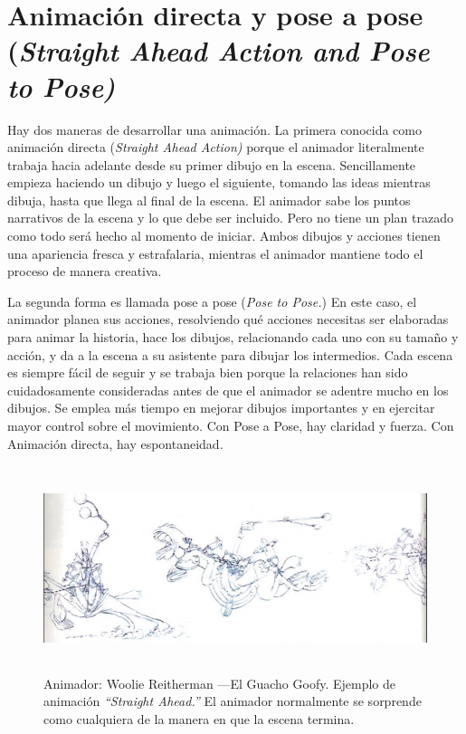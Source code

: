 \documentclass[a4paper,12pt]{report}
\begin{document}
 
\section{Animación directa y pose a pose (\textit{Straight Ahead Action and Pose to Pose)}}
 
 
Hay dos maneras de desarrollar una animación. La primera conocida como animación directa (\textit{Straight Ahead Action)}
porque el animador literalmente trabaja hacia adelante desde su primer dibujo en la escena. Sencillamente empieza haciendo un
dibujo y luego el siguiente, tomando las ideas mientras dibuja, hasta que llega al final de la escena. El animador sabe los puntos
narrativos de la escena y lo que debe ser incluido. Pero no tiene un plan trazado como todo será hecho al momento de iniciar.
Ambos dibujos y acciones tienen una apariencia fresca y estrafalaria, mientras el animador mantiene todo el proceso de manera creativa.\cite{principles_animation}
 
 
La segunda forma es llamada pose a pose (\textit{Pose to Pose.}) En este caso, el animador planea sus acciones, resolviendo qué acciones necesitas ser elaboradas para animar la historia, hace los dibujos, relacionando cada uno con su tamaño y acción,
y da a la escena a su asistente para dibujar los intermedios. Cada escena es siempre fácil de seguir y se trabaja bien porque la relaciones han sido
cuidadosamente consideradas antes de que el animador se adentre mucho en los dibujos. Se emplea más tiempo en mejorar dibujos importantes y en ejercitar
mayor control sobre el movimiento. Con Pose a Pose, hay claridad y fuerza. Con Animación directa, hay espontaneidad.\cite{principles_animation}
 
 
\begin{figure}[ht]
    \hspace*{-1cm}
    \includegraphics[height=6cm]{Imagenes/el_guacho_goofy}
    \caption{Animador: Woolie Reitherman ---El Guacho Goofy.
    Ejemplo de animación \textit{``Straight Ahead.''} El animador normalmente se sorprende como cualquiera
    de la manera en que la escena termina.}
    \label{fig:el_guacho_goofy}
\end{figure}
 
\end{document}
